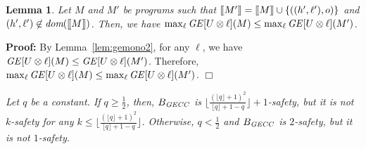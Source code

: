 \documentclass{llncs}
\newtheorem{lemma}[theorem]{Lemma}
\newenvironment{proof}{\noindent\rm{\bf Proof:}}{\hbox{$\Box$}\vspace*{0.2\baselineskip}}
\newenvironment{reftheorem}[1]{\begin{trivlist}\item[\hskip
      \labelsep{\bf Theorem #1.}]\it}{\end{trivlist}}
\newcommand{\aset}[1]{\{{#1}\}}
\newcommand{\sembrack}[1]{[\hspace*{-1.2pt}[#1]\hspace*{-1.2pt}]}
\newcommand{\dom}{\mathop\textit{dom}\nolimits}
\begin{document}
\begin{lemma}
\label{lem:geccmono}
  Let $M$ and $M'$ be programs such that
  $\sembrack{M'}=\sembrack{M}\cup\aset{((h',\ell'),o)}$ and
  $(h',\ell')\not\in\dom(\sembrack{M})$.  Then, we have $\max_\ell
  {\it GE}[U\otimes\ell](M)\le\max_\ell {\it GE}[U\otimes\ell](M')$.
\end{lemma}
\begin{proof}
By Lemma~\ref{lem:gemono2}, for any $\ell$, we have ${\it
GE}[U\otimes\ell](M)\le {\it GE}[U\otimes\ell](M')$.  Therefore,
$\max_\ell {\it GE}[U\otimes\ell](M)\le\max_\ell {\it
GE}[U\otimes\ell](M')$.
\end{proof}

\begin{reftheorem}{\ref{thm:gecck}}
  Let $q$ be a constant.  If $q\ge\frac{1}{2}$, then, $B_{\it GECC}$
  is $\lfloor\frac{(\lfloor q\rfloor +1)^2}{\lfloor q\rfloor +1 -q}
  \rfloor +1$-safety, but it is not $k$-safety for any $k \leq
  \lfloor\frac{(\lfloor q\rfloor +1)^2}{\lfloor q\rfloor +1 -q}
  \rfloor$.  Otherwise, $q<\frac{1}{2}$ and $B_{\it GECC}$ is
  $2$-safety, but it is not $1$-safety.
\end{reftheorem}
\end{document}
